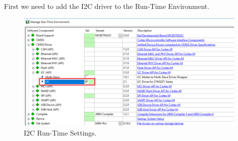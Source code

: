 \documentclass{article}
\begin{document}
First we need to add the I2C driver to the Run-Time Environment.
\begin{figure}[H]
    \centering
    \includegraphics[width=0.8\linewidth]{pics/I2CRuntime.png}
    \caption{I2C Run-Time Settings.}
    \label{fig:I2CRuntime}
\end{figure}
\end{document}
